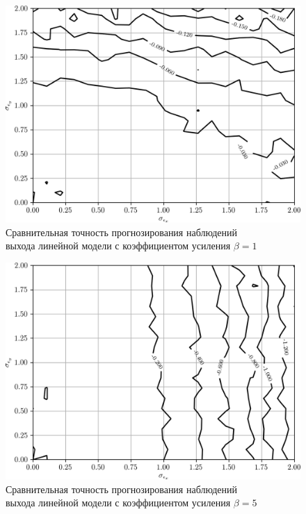 \begin{figure}[h]
  \centering
  \includegraphics[width=135mm]{fig/linear/predict/beta-1_predict-measured.png}
  \caption{%
    Сравнительная точность прогнозирования наблюдений \\
    выхода линейной модели с коэффициентом усиления \( \beta = 1 \)
  }\label{fig:comparison_linear_predict_beta-1}
\end{figure}

\begin{figure}[h]
  \centering
  \includegraphics[width=135mm]{fig/linear/predict/beta-5_predict-measured.png}
  \caption{%
    Сравнительная точность прогнозирования наблюдений \\
    выхода линейной модели с коэффициентом усиления \( \beta = 5 \)
  }\label{fig:comparison_linear_predict_beta-5}
\end{figure}

